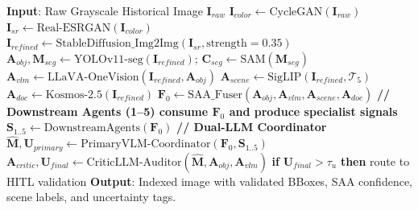 \documentclass[12pt,onecolumn,a4paper]{IEEEtran}
\begin{document}
\begin{algorithm}[h]
\caption{Multi-Agent Validation for Archival Object and Scene Detection (Upgraded Agent 0 + Dual-LLM Coordinator)}
\begin{algorithmic}[1]
\State \textbf{Input}: Raw Grayscale Historical Image $\mathbf{I}_{raw}$
\State $\mathbf{I}_{color} \gets \text{CycleGAN}(\mathbf{I}_{raw})$ 
\State $\mathbf{I}_{sr} \gets \text{Real-ESRGAN}(\mathbf{I}_{color})$ 
\State $\mathbf{I}_{refined} \gets \text{StableDiffusion\_Img2Img}(\mathbf{I}_{sr}, \text{strength}=0.35)$
\State $\mathbf{A}_{obj}, \mathbf{M}_{seg} \gets \text{YOLOv11-seg}(\mathbf{I}_{refined})$; $\mathbf{C}_{seg} \gets \text{SAM}(\mathbf{M}_{seg})$ 
\State $\mathbf{A}_{vlm} \gets \text{LLaVA-OneVision}(\mathbf{I}_{refined}, \mathbf{A}_{obj})$ 
\State $\mathbf{A}_{scene} \gets \text{SigLIP}(\mathbf{I}_{refined}, \mathcal{T}_{5})$ 
\State $\mathbf{A}_{doc} \gets \text{Kosmos-2.5}(\mathbf{I}_{refined})$ 
\State $\mathbf{F}_{0} \gets \text{SAA\_Fuser}(\mathbf{A}_{obj}, \mathbf{A}_{vlm}, \mathbf{A}_{scene}, \mathbf{A}_{doc})$ 
\State \textbf{// Downstream Agents (1--5) consume $\mathbf{F}_{0}$ and produce specialist signals}
\State $\mathbf{S}_{1..5} \gets \text{DownstreamAgents}(\mathbf{F}_{0})$
\State \textbf{// Dual-LLM Coordinator}
\State $\hat{\mathbf{M}}, \mathbf{U}_{primary} \gets \text{PrimaryVLM-Coordinator}(\mathbf{F}_{0}, \mathbf{S}_{1..5})$ 
\State $\mathbf{A}_{critic}, \mathbf{U}_{final} \gets \text{CriticLLM-Auditor}(\hat{\mathbf{M}}, \mathbf{A}_{obj}, \mathbf{A}_{vlm})$ 
\State \textbf{if} $\mathbf{U}_{final} > \tau_u$ \textbf{then} route to HITL validation
\State \textbf{Output}: Indexed image with validated BBoxes, SAA confidence, scene labels, and uncertainty tags.
\end{algorithmic}
\label{alg:pure_pipeline}
\end{algorithm}
\end{document}

